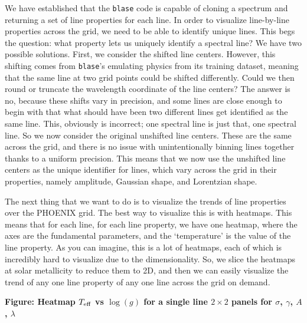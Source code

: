 \documentclass[twocolumn]{aastex631}
\def\Teff{T_{\rm eff}}
\def\logg{\log(g)}
\begin{document}
We have established that the \texttt{blase} code is capable of cloning a spectrum and
returning a set of line properties for each line. In order to visualize line-by-line
properties across the grid, we need to be able to identify unique lines. This begs the question:
what property lets us uniquely identify a spectral line? We have two possible solutions.
First, we consider the shifted line centers. However, this shifting comes from \texttt{blase}'s
emulating physics from its training dataset, meaning that the same line at two grid points could
be shifted differently. Could we then round or truncate the wavelength coordinate of the line centers?
The answer is no, because these shifts vary in precision, and some lines are close enough to begin with
that what should have been two different lines get identified as the same line. This, obviously is incorrect;
one spectral line is just that, one spectral line. So we now consider the original unshifted line centers.
These are the same across the grid, and there is no issue with unintentionally binning lines together
thanks to a uniform precision. This means that we now use the unshifted line centers as the unique
identifier for lines, which vary across the grid in their properties, namely amplitude, Gaussian shape,
and Lorentzian shape.

The next thing that we want to do is to visualize the trends of line properties over
the PHOENIX grid. The best way to visualize this is with heatmaps. This means that for
each line, for each line property, we have one heatmap, where the axes are the fundamental
parameters, and the `temperature' is the value of the line property. As you can imagine, this
is a lot of heatmaps, each of which is incredibly hard to visualize due to the dimensionality.
So, we slice the heatmaps at solar metallicity to reduce them to 2D, and then we can easily 
visualize the trend of any one line property of any one line across the grid on demand.

\begin{mdframed}
    \textbf{Figure: Heatmap $\Teff$ vs $\logg$ for a single line $2\times2$ panels for $\sigma$, $\gamma$, $A$, $\lambda$ }
\end{mdframed}
\end{document}
